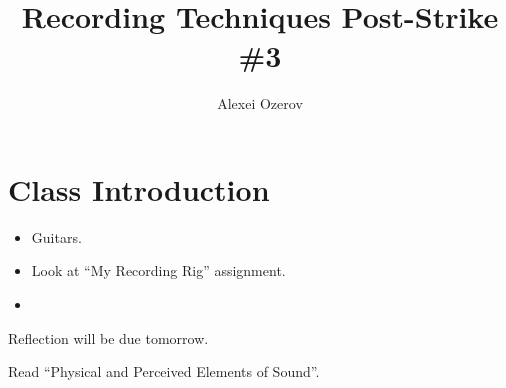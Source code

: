 \documentclass{article}
\title{Recording Techniques Post-Strike \#3}
\author{Alexei Ozerov}
\date{}
\begin{document}
\maketitle

\section{Class Introduction}

\begin{itemize}
\item Guitars.
\item Look at ``My Recording Rig'' assignment.
\item 
\end{itemize}

\medskip

Reflection will be due tomorrow.

\medskip

Read ``Physical and Perceived Elements of Sound''.

\medskip
\end{document}
